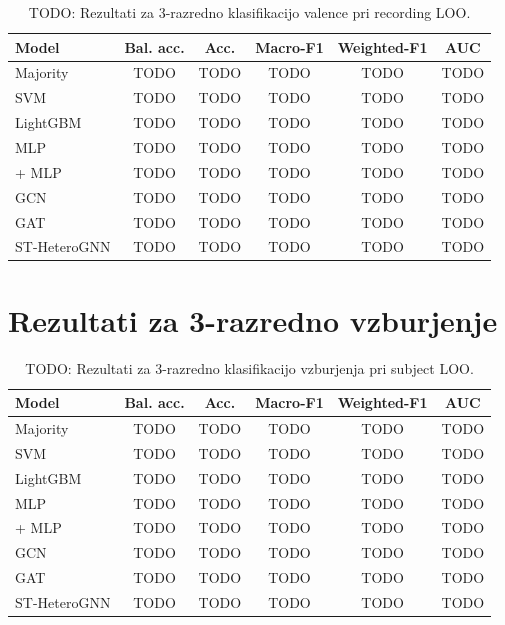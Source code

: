 \begin{table}[H]
    \centering
    \caption{TODO: Rezultati za 3-razredno klasifikacijo valence pri recording LOO.}
    \label{tab:results-valence-recording-loo}
    \begin{tabular}{lccccc}
        \toprule
        Model & Bal. acc. & Acc. & Macro-F1 & Weighted-F1 & AUC \\
        \midrule
        Majority & TODO & TODO & TODO & TODO & TODO \\
        SVM & TODO & TODO & TODO & TODO & TODO \\
        LightGBM & TODO & TODO & TODO & TODO & TODO \\
        MLP & TODO & TODO & TODO & TODO & TODO \\
        \GazeMAE{} + MLP & TODO & TODO & TODO & TODO & TODO \\
        GCN & TODO & TODO & TODO & TODO & TODO \\
        GAT & TODO & TODO & TODO & TODO & TODO \\
        ST-HeteroGNN & TODO & TODO & TODO & TODO & TODO \\
        \bottomrule
    \end{tabular}
\end{table}


\section{Rezultati za 3-razredno vzburjenje}
\label{subsec:rezultati-arousal}

\begin{table}[H]
    \centering
    \caption{TODO: Rezultati za 3-razredno klasifikacijo vzburjenja pri subject LOO.}
    \label{tab:results-arousal-subject-loo}
    \begin{tabular}{lccccc}
        \toprule
        Model & Bal. acc. & Acc. & Macro-F1 & Weighted-F1 & AUC \\
        \midrule
        Majority & TODO & TODO & TODO & TODO & TODO \\
        SVM & TODO & TODO & TODO & TODO & TODO \\
        LightGBM & TODO & TODO & TODO & TODO & TODO \\
        MLP & TODO & TODO & TODO & TODO & TODO \\
        \GazeMAE{} + MLP & TODO & TODO & TODO & TODO & TODO \\
        GCN & TODO & TODO & TODO & TODO & TODO \\
        GAT & TODO & TODO & TODO & TODO & TODO \\
        ST-HeteroGNN & TODO & TODO & TODO & TODO & TODO \\
        \bottomrule
    \end{tabular}
\end{table}

